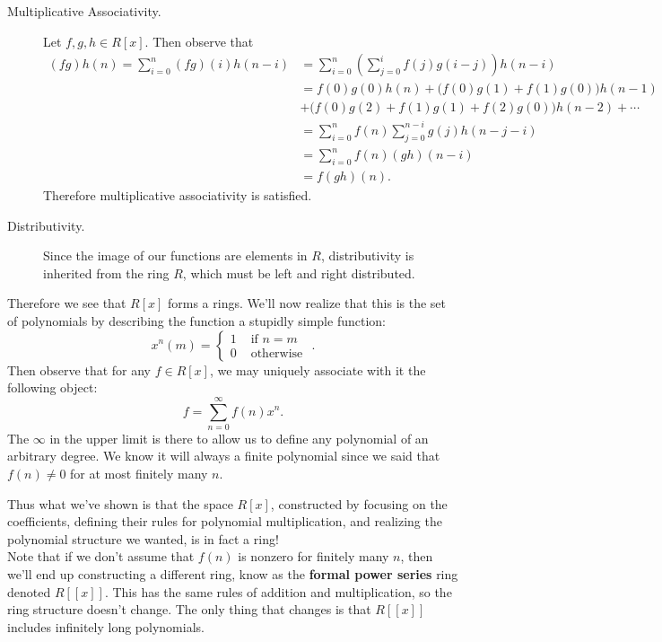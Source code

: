 \begin{description}
        \item[Multiplicative Associativity.]
        Let $f, g, h \in R[x]$. Then observe that 
        \begin{align*}
            (fg)h(n) = \sum_{i = 0}^{n}(fg)(i)h(n - i) &= 
            \sum_{i = 0}^{n}\left( \sum_{j = 0}^{i}f(j)g(i - j) \right)h(n - i)\\
            &= f(0)g(0)h(n) + \Big(f(0)g(1) + f(1)g(0)\Big)h(n-1)\\ 
            &+ \Big(f(0)g(2) + f(1)g(1) + f(2)g(0)\Big)h(n-2) + \cdots \\
            &= \sum_{i = 0}^{n}f(n)\sum_{j = 0}^{n-i}g(j)h(n-j-i)\\
            &= \sum_{i = 0}^{n}f(n)(gh)(n - i)\\
            &= f(gh)(n).
        \end{align*}
        Therefore multiplicative associativity is satisfied.
        
        \item[Distributivity.] 
        Since the image of our functions are elements in $R$, distributivity is inherited from the ring $R$, which must
        be left and right distributed. 
    \end{description}

    Therefore we see that $R[x]$ forms a rings. We'll now realize
    that this is the set of polynomials by describing the function
    a stupidly simple function: 
    \[
        x^n(m) = 
        \begin{cases}
            1 & \text{ if } n = m\\
            0 & \text{ otherwise }
        \end{cases}.
    \]
    Then observe that for any $f \in R[x]$, we may uniquely associate
    with it the following object: 
    \[
        f = \sum_{n = 0}^{\infty}f(n)x^n.
    \]
    The $\infty$ in the upper limit is there to allow us to define
    any polynomial of an arbitrary degree. We know it will always
    a finite polynomial since we said that $f(n) \ne 0$ for at
    most finitely many $n$. 

    Thus what we've shown is that the space $R[x]$, constructed by
    focusing on the coefficients, defining their rules for
    polynomial multiplication, and realizing the polynomial
    structure we wanted, is in fact a ring!
    \\

    Note that if we don't assume that $f(n)$ is nonzero for
    finitely many $n$, then we'll end up constructing a different
    ring, know as the \textbf{formal power series} ring denoted $R[[x]]$. This has
    the same rules of addition and multiplication, so the ring
    structure doesn't change. The only thing that changes is that
    $R[[x]]$ includes infinitely long polynomials. 

